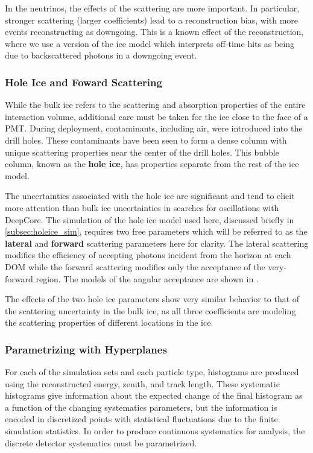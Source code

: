 In the neutrinos, the effects of the scattering are more important.
In particular, stronger scattering (larger coefficients) lead to a reconstruction bias, with more events reconstructing as downgoing.
This is a known effect of the reconstruction, where we use a version of the ice model which interprets off-time hits as being due to backscattered photons in a downgoing event.


\subsubsection{Hole Ice and Foward Scattering}
\label{subsubsec:holeice}
While the bulk ice refers to the scattering and absorption properties of the entire interaction volume, additional care must be taken for the ice close to the face of a PMT.
During deployment, contaminants, including air, were introduced into the drill holes.
These contaminants have been seen to form a dense column with unique scattering properties near the center of the drill holes.
This bubble column, known as the \textbf{hole ice}, has properties separate from the rest of the ice model.

The uncertainties associated with the hole ice are significant and tend to elicit more attention than bulk ice uncertainties in searches for oscillations with DeepCore.
The simulation of the hole ice model used here, discussed briefly in \ref{subsec:holeice_sim}, requires two free parameters which will be referred to as the \textbf{lateral} and \textbf{forward} scattering parameters here for clarity.
The lateral scattering modifies the efficiency of accepting photons incident from the horizon at each DOM while the forward scattering modifies only the acceptance of the very-forward region.
The models of the angular acceptance are shown in .

The effects of the two hole ice parameters show very similar behavior to that of the scattering uncertainty in the bulk ice, as all three coefficients are modeling the scattering properties of different locations in the ice.

\label{subsubsec:hyperplanes}
\subsubsection{Parametrizing with Hyperplanes}
For each of the simulation sets and each particle type, histograms are produced using the reconstructed energy, zenith, and track length. 
These systematic histograms give information about the expected change of the final histogram as a function of the changing systematics parameters, but the information is encoded in discretized points with statistical fluctuations due to the finite simulation statistics.
In order to produce continuous systematics for analysis, the discrete detector systematics must be parametrized.

